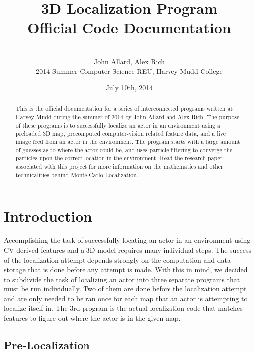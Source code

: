 \documentclass[a4paper,11pt]{article}
\title{3D Localization Program \\ Official Code Documentation}
\author{ \\[6.5in]  John Allard, Alex Rich \\ 2014 Summer Computer Science REU, Harvey Mudd College}
\date{July 10th, 2014}
\begin{document}
  \maketitle
  
  \newpage

    \tableofcontents
    \newpage
    
    \begin{abstract}
    This is the official documentation for a series of interconnected programs written at Harvey Mudd during the summer of 2014 by John Allard and Alex Rich. The purpose of these programs is to successfully localize an actor in an environment using a preloaded 3D map, precomputed computer-vision related feature data, and a live image feed from an actor in the environment. The program starts with a large amount of guesses as to where the actor could be, and uses particle filtering to converge the particles upon the correct location in the environment. Read the research paper associated with this project for more information on the mathematics and other technicalities behind Monte Carlo Localization.
    \end{abstract}

    \section{Introduction}
    Accomplishing the task of successfully locating an actor in an environment using CV-derived features and a 3D model requires many individual steps. The success of the localization attempt depends strongly on the computation and data storage that is done before any attempt is made. With this in mind, we decided to subdivide the task of localizing an actor into three separate programs that must be run individually. Two of them are done before the localization attempt and are only needed to be ran once for each map that an actor is attempting to localize itself in. The 3rd program is the actual localization code that matches features to figure out where the actor is in the given map.

        \subsection{Pre-Localization}
\end{document}

